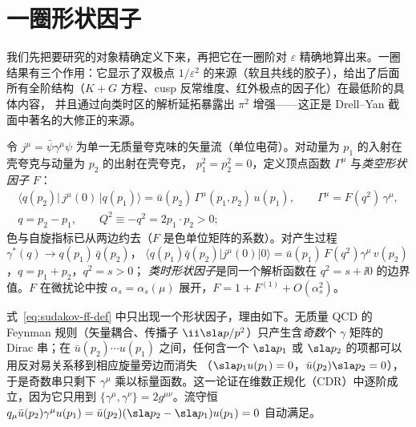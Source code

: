 \section{一圈形状因子}\label{sec:sudakov-oneloop}

我们先把要研究的对象精确定义下来，再把它在一圈阶对 $\varepsilon$ 精确地算出来。一圈结果有三个作用：它显示了双极点
$1/\varepsilon^2$ 的来源（软且共线的胶子），给出了后面所有全阶结构（$K+G$ 方程、cusp 反常维度、红外极点的因子化）在最低阶的具体内容，
并且通过向类时区的解析延拓暴露出 $\pi^2$ 增强——这正是 Drell--Yan 截面中著名的大修正的来源。

\begin{definition}[夸克形状因子]\label{def:sudakov-ff}
令 $j^\mu=\bar\psi\gamma^\mu\psi$ 为单一无质量夸克味的矢量流（单位电荷）。对动量为 $p_1$ 的入射在壳夸克与动量为 $p_2$ 的出射在壳夸克，
$p_1^2=p_2^2=0$，定义顶点函数 $\Gamma^\mu$ 与\emph{类空形状因子} $F$：
\begin{equation}\label{eq:sudakov-ff-def}
\begin{gathered}
\langle q(p_2)|\,j^\mu(0)\,|q(p_1)\rangle=\bar u(p_2)\,\Gamma^\mu(p_1,p_2)\,u(p_1),\qquad
\Gamma^\mu=F(q^2)\,\gamma^\mu,\\
q=p_2-p_1,\qquad Q^2\equiv-q^2=2p_1\cdot p_2>0 ;
\end{gathered}
\end{equation}
色与自旋指标已从两边约去（$F$ 是色单位矩阵的系数）。对产生过程 $\gamma^*(q)\to q(p_1)\,\bar q(p_2)$，
$\langle q(p_1)\bar q(p_2)|j^\mu(0)|0\rangle=\bar u(p_1)\,F(q^2)\gamma^\mu\,v(p_2)$，$q=p_1+p_2$，$q^2=s>0$；
\emph{类时形状因子}是同一个解析函数在 $q^2=s+\ii0$ 的边界值。$F$ 在微扰论中按 $\alpha_s=\alpha_s(\mu)$ 展开，$F=1+F^{(1)}+O(\alpha_s^2)$。
\end{definition}

式~\eqref{eq:sudakov-ff-def} 中只出现一个形状因子，理由如下。无质量 QCD 的 Feynman 规则（矢量耦合、传播子 $\ii\sla p/p^2$）只产生含\emph{奇数}个
$\gamma$ 矩阵的 Dirac 串；在 $\bar u(p_2)\cdots u(p_1)$ 之间，任何含一个 $\sla p_1$ 或 $\sla p_2$ 的项都可以用反对易关系移到相应旋量旁边而消失
（$\sla p_1u(p_1)=0$，$\bar u(p_2)\sla p_2=0$），于是奇数串只剩下 $\gamma^\mu$ 乘以标量函数。这一论证在维数正规化（CDR）中逐阶成立，因为它只用到
$\{\gamma^\mu,\gamma^\nu\}=2g^{\mu\nu}$。流守恒 $q_\mu\bar u(p_2)\gamma^\mu u(p_1)=\bar u(p_2)(\sla p_2-\sla p_1)u(p_1)=0$ 自动满足。

